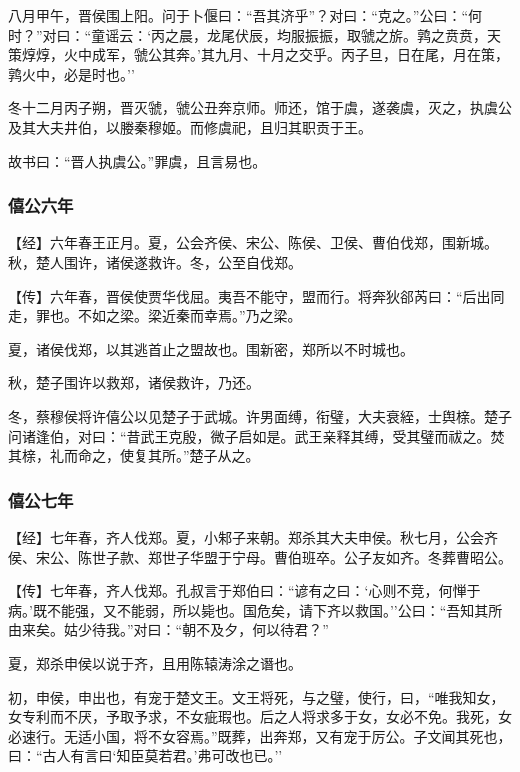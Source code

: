 \documentclass[]{article}
\begin{document}
八月甲午，晋侯围上阳。问于卜偃曰：``吾其济乎''？对曰：``克之。''公曰：``何时？''对曰：``童谣云：`丙之晨，龙尾伏辰，均服振振，取虢之旂。鹑之贲贲，天策焞焞，火中成军，虢公其奔。'其九月、十月之交乎。丙子旦，日在尾，月在策，鹑火中，必是时也。''

冬十二月丙子朔，晋灭虢，虢公丑奔京师。师还，馆于虞，遂袭虞，灭之，执虞公及其大夫井伯，以媵秦穆姬。而修虞祀，且归其职贡于王。

故书曰：``晋人执虞公。''罪虞，且言易也。

\hypertarget{header-n709}{%
\subsubsection{僖公六年}\label{header-n709}}

【经】六年春王正月。夏，公会齐侯、宋公、陈侯、卫侯、曹伯伐郑，围新城。秋，楚人围许，诸侯遂救许。冬，公至自伐郑。

【传】六年春，晋侯使贾华伐屈。夷吾不能守，盟而行。将奔狄郤芮曰：``后出同走，罪也。不如之梁。梁近秦而幸焉。''乃之梁。

夏，诸侯伐郑，以其逃首止之盟故也。围新密，郑所以不时城也。

秋，楚子围许以救郑，诸侯救许，乃还。

冬，蔡穆侯将许僖公以见楚子于武城。许男面缚，衔璧，大夫衰絰，士舆榇。楚子问诸逢伯，对曰：``昔武王克殷，微子启如是。武王亲释其缚，受其璧而祓之。焚其榇，礼而命之，使复其所。''楚子从之。

\hypertarget{header-n717}{%
\subsubsection{僖公七年}\label{header-n717}}

【经】七年春，齐人伐郑。夏，小邾子来朝。郑杀其大夫申侯。秋七月，公会齐侯、宋公、陈世子款、郑世子华盟于宁母。曹伯班卒。公子友如齐。冬葬曹昭公。

【传】七年春，齐人伐郑。孔叔言于郑伯曰：``谚有之曰：`心则不竞，何惮于病。'既不能强，又不能弱，所以毙也。国危矣，请下齐以救国。''公曰：``吾知其所由来矣。姑少待我。''对曰：``朝不及夕，何以待君？''

夏，郑杀申侯以说于齐，且用陈辕涛涂之谮也。

初，申侯，申出也，有宠于楚文王。文王将死，与之璧，使行，曰，``唯我知女，女专利而不厌，予取予求，不女疵瑕也。后之人将求多于女，女必不免。我死，女必速行。无适小国，将不女容焉。''既葬，出奔郑，又有宠于厉公。子文闻其死也，曰：``古人有言曰`知臣莫若君。'弗可改也已。''
\end{document}
